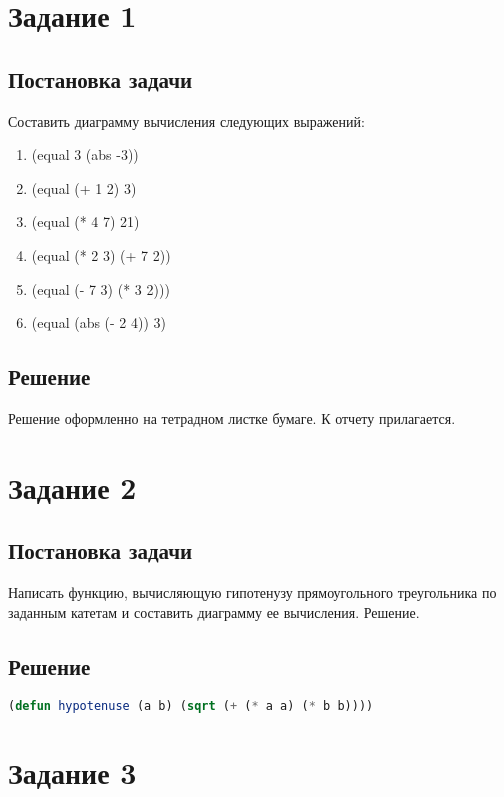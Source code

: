 \section*{Задание 1}
\subsection*{Постановка задачи}

Составить диаграмму вычисления следующих выражений:

\begin{enumerate}
	\item (equal 3 (abs -3))
	\item (equal (+ 1 2) 3)
	\item (equal (* 4 7) 21)
	\item (equal (* 2 3) (+ 7 2))
	\item (equal (- 7 3) (* 3 2)))
	\item (equal (abs (- 2 4)) 3)
\end{enumerate}

\subsection*{Решение}
Решение оформленно на тетрадном листке бумаге. К отчету прилагается.

\section*{Задание 2}
\subsection*{Постановка задачи}

Написать функцию, вычисляющую гипотенузу прямоугольного треугольника по заданным катетам и составить диаграмму ее вычисления. Решение.

\subsection*{Решение}

\begin{lstlisting}[label=second,caption=Решение задания №2, language=lisp]
(defun hypotenuse (a b) (sqrt (+ (* a a) (* b b))))
\end{lstlisting}

\section*{Задание 3}
